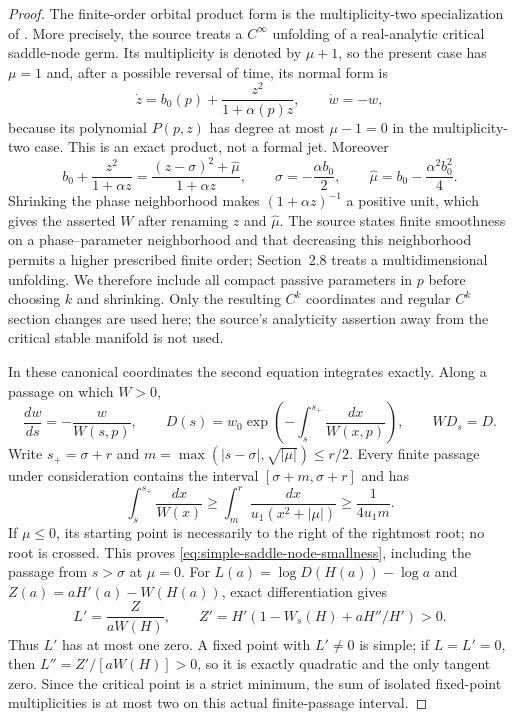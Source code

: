 \begin{proof}
The finite-order orbital product form is the multiplicity-two
specialization of \cite[Section~2.1, equation~(2.2), Theorem~3, and
Section~2.8]{DIR2002}.  More precisely, the source treats a
$C^\infty$ unfolding of a real-analytic critical saddle-node germ.
Its multiplicity is denoted by $\mu+1$, so the present case has
$\mu=1$ and, after a possible reversal of time, its normal form is
\[
 \dot z=b_0(p)+\frac{z^2}{1+\alpha(p)z},\qquad \dot w=-w,
\]
because its polynomial $P(p,z)$ has degree at most $\mu-1=0$ in the
multiplicity-two case.  This is an exact product, not a formal jet.
Moreover
\[
 b_0+\frac{z^2}{1+\alpha z}
 =\frac{(z-\sigma)^2+\widehat\mu}{1+\alpha z},\qquad
 \sigma=-\frac{\alpha b_0}{2},\qquad
 \widehat\mu=b_0-\frac{\alpha^2b_0^2}{4}.
\]
Shrinking the phase neighborhood makes $(1+\alpha z)^{-1}$ a positive
unit, which gives the asserted $W$ after renaming $z$ and
$\widehat\mu$.  The source states finite smoothness on a
phase--parameter neighborhood and that decreasing this neighborhood
permits a higher prescribed finite order; Section~2.8 treats a
multidimensional unfolding.  We therefore include all compact passive
parameters in $p$ before choosing $k$ and shrinking.  Only the resulting
$C^k$ coordinates and regular $C^k$ section changes are used here; the
source's analyticity assertion away from the critical stable manifold
is not used.

In these canonical coordinates the second equation integrates exactly.
Along a passage on which $W>0$,
\[
 \frac{dw}{ds}=-\frac{w}{W(s,p)},\qquad
 D(s)=w_0\exp\left(-\int_s^{s_+}\frac{dx}{W(x,p)}\right),
 \qquad WD_s=D.
\]
Write $s_+=\sigma+r$ and
$m=\max(|s-\sigma|,\sqrt{|\mu|})\le r/2$.
Every finite passage under consideration contains the interval
$[\sigma+m,\sigma+r]$ and has
\[
 \int_s^{s_+}\frac{dx}{W(x)}\ge
 \int_m^r\frac{dx}{u_1(x^2+|\mu|)}\ge\frac1{4u_1m}.
\]
If $\mu\le0$, its starting point is necessarily to the right of the
rightmost root; no root is crossed.  This proves
\eqref{eq:simple-saddle-node-smallness}, including the passage from
$s>\sigma$ at $\mu=0$.
For $L(a)=\log D(H(a))-\log a$ and
$Z(a)=aH'(a)-W(H(a))$, exact differentiation gives
\[
 L'=\frac{Z}{aW(H)},\qquad
 Z'=H'\left(1-W_s(H)+aH''/H'\right)>0.
\]
Thus $L'$ has at most one zero. A fixed point with $L'\ne0$ is
simple; if $L=L'=0$, then $L''=Z'/[aW(H)]>0$, so it is exactly
quadratic and the only tangent zero. Since the critical point is a
strict minimum, the sum of isolated fixed-point multiplicities is at
most two on this actual finite-passage interval.
\end{proof}


